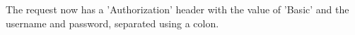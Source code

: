 The request now has a 'Authorization' header with the value of 'Basic' and the username and password, separated using a colon.